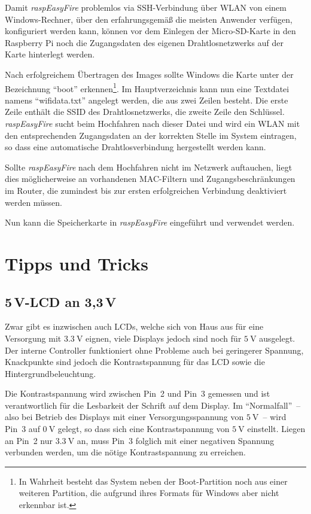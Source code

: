 \documentclass[paper=a4, parskip, numbers=noenddot, toc=listof, headsepline]{scrbook}
\newcommand{\REF}{\emph{raspEasyFire}}
\begin{document}
			Damit {\REF} problemlos via SSH-Verbindung über WLAN von einem Windows-Rechner, über den erfahrungsgemäß die meisten Anwender verfügen, konfiguriert werden kann, können vor dem Einlegen der Micro-SD-Karte in den Raspberry Pi noch die Zugangsdaten des eigenen Drahtlosnetzwerks auf der Karte hinterlegt werden.

			Nach erfolgreichem Übertragen des Images sollte Windows die Karte unter der Bezeichnung \enquote{boot} erkennen\footnote{In Wahrheit besteht das System neben der Boot-Partition noch aus einer weiteren Partition, die aufgrund ihres Formats für Windows aber nicht erkennbar ist.}. Im Hauptverzeichnis kann nun eine Textdatei namens \enquote{wifidata.txt} angelegt werden, die aus zwei Zeilen besteht. Die erste Zeile enthält die SSID des Drahtlosnetzwerks, die zweite Zeile den Schlüssel. {\REF} sucht beim Hochfahren nach dieser Datei und wird ein WLAN mit den entsprechenden Zugangsdaten an der korrekten Stelle im System eintragen, so dass eine automatische Drahtlosverbindung hergestellt werden kann.

			Sollte {\REF} nach dem Hochfahren nicht im Netzwerk auftauchen, liegt dies möglicherweise an vorhandenen MAC-Filtern und Zugangsbeschränkungen im Router, die zumindest bis zur ersten erfolgreichen Verbindung deaktiviert werden müssen.

			Nun kann die Speicherkarte in {\REF} eingeführt und verwendet werden.

	\chapter{Tipps und Tricks}

		\section[5V-LCD an 3,3V]{5\,V-LCD an 3,3\,V}

			Zwar gibt es inzwischen auch LCDs, welche sich von Haus aus für eine Versorgung mit $\SI{3,3}{\volt}$ eignen, viele Displays jedoch sind noch für $\SI{5}{\volt}$ ausgelegt. Der interne Controller funktioniert ohne Probleme auch bei geringerer Spannung, Knackpunkte sind jedoch die Kontrastspannung für das LCD sowie die Hintergrundbeleuchtung.

			Die Kontrastspannung wird zwischen Pin~2 und Pin~3 gemessen und ist verantwortlich für die Lesbarkeit der Schrift auf dem Display. Im \enquote{Normalfall}~-- also bei Betrieb des Displays mit einer Versorgungsspannung von $\SI{5}{\volt}$~-- wird Pin~3 auf $\SI{0}{\volt}$ gelegt, so dass sich eine Kontrastspannung von $\SI{5}{\volt}$ einstellt. Liegen an Pin~2 nur $\SI{3,3}{\volt}$ an, muss Pin~3 folglich mit einer negativen Spannung verbunden werden, um die nötige Kontrastspannung zu erreichen.
\end{document}
